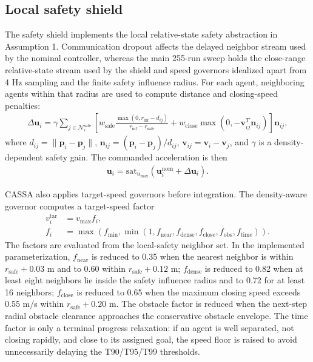 \documentclass[11pt]{article}
\begin{document}
\subsection{Local safety shield}

The safety shield implements the local relative-state safety abstraction in Assumption 1. Communication dropout affects the delayed neighbor stream used by the nominal controller, whereas the main 255-run sweep holds the close-range relative-state stream used by the shield and speed governors idealized apart from 4 Hz sampling and the finite safety influence radius. For each agent, neighboring agents within that radius are used to compute distance and closing-speed penalties:
\begin{align}
    \Delta \mathbf{u}_i =
    \gamma \sum_{j \in \mathcal{N}^{\mathrm{safe}}_i}
    \left[
    w_{\mathrm{safe}}
    \frac{\max(0,r_{\mathrm{inf}} - d_{ij})}{r_{\mathrm{inf}} - r_{\mathrm{safe}}}
    +
    w_{\mathrm{close}} \max(0,-\mathbf{v}_{ij}^{T}\mathbf{n}_{ij})
    \right]\mathbf{n}_{ij},
\end{align}
where $d_{ij}=\|\mathbf{p}_i-\mathbf{p}_j\|$, $\mathbf{n}_{ij}=(\mathbf{p}_i-\mathbf{p}_j)/d_{ij}$, $\mathbf{v}_{ij}=\mathbf{v}_i-\mathbf{v}_j$, and $\gamma$ is a density-dependent safety gain. The commanded acceleration is then
\begin{align}
    \mathbf{u}_i = \mathrm{sat}_{u_{\max}}\left(\mathbf{u}^{\mathrm{nom}}_i + \Delta \mathbf{u}_i\right).
\end{align}

CASSA also applies target-speed governors before integration. The density-aware governor computes a target-speed factor
\begin{align}
    v^{\mathrm{tar}}_i &= v_{\max} f_i,\\
    f_i &=
    \max(f_{\min},\min(1,f_{\mathrm{near}},f_{\mathrm{dense}},f_{\mathrm{close}},f_{\mathrm{obs}},f_{\mathrm{time}})).
\end{align}
The factors are evaluated from the local-safety neighbor set. In the implemented parameterization, $f_{\mathrm{near}}$ is reduced to 0.35 when the nearest neighbor is within $r_{\mathrm{safe}}+0.03$ m and to 0.60 within $r_{\mathrm{safe}}+0.12$ m; $f_{\mathrm{dense}}$ is reduced to 0.82 when at least eight neighbors lie inside the safety influence radius and to 0.72 for at least 16 neighbors; $f_{\mathrm{close}}$ is reduced to 0.65 when the maximum closing speed exceeds 0.55 m/s within $r_{\mathrm{safe}}+0.20$ m. The obstacle factor is reduced when the next-step radial obstacle clearance approaches the conservative obstacle envelope. The time factor is only a terminal progress relaxation: if an agent is well separated, not closing rapidly, and close to its assigned goal, the speed floor is raised to avoid unnecessarily delaying the T90/T95/T99 thresholds.
\end{document}
